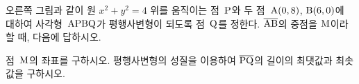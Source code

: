 \noindent\begin{minipage}[t]{0.58\linewidth}\vspace{0pt}\raggedright 오른쪽 그림과 같이 원 $x^2+y^2=4$ 위를 움직이는 점~$\mathrm{P}$와 두 점~$\mathrm{A}(0{,}\mkern3mu\mathopen{}8)$, $\mathrm{B}(6{,}\mkern3mu\mathopen{}0)$에 대하여 사각형~$\mathrm{APBQ}$가 평행사변형이 되도록 점~$\mathrm{Q}$를 정한다. $\overline{\mathrm{AB}}$의 중점을 $\mathrm{M}$이라 할 때, 다음에 답하시오.\end{minipage}\hfill\begin{minipage}[t]{0.4\linewidth}\vspace{0pt}\centering \resizebox{\ifdim\width>\linewidth\linewidth\else\width\fi}{!}{}\end{minipage}\par
{} 점~$\mathrm{M}$의 좌표를 구하시오.
 평행사변형의 성질을 이용하여 $\overline{\mathrm{PQ}}$의 길이의 최댓값과 최솟값을 구하시오.
